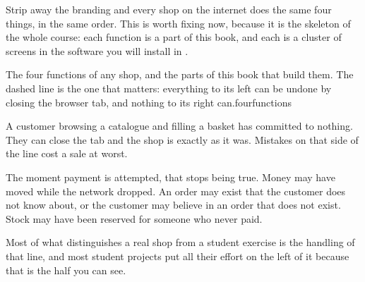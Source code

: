 Strip away the branding and every shop on the internet does the same four
things, in the same order. This is worth fixing now, because it is the skeleton
of the whole course: each function is a part of this book, and each is a cluster
of screens in the software you will install in .

%
{The four functions of any shop, and the parts of this book that build them.
The dashed line is the one that matters: everything to its left can be undone
by closing the browser tab, and nothing to its right can.}{fourfunctions}

\begin{conceptbox}
A customer browsing a catalogue and filling a basket has committed to nothing.
They can close the tab and the shop is exactly as it was. Mistakes on that side
of the line cost a sale at worst.

\smallskip
The moment payment is attempted, that stops being true. Money may have moved
while the network dropped. An order may exist that the customer does not know
about, or the customer may believe in an order that does not exist. Stock may
have been reserved for someone who never paid.

\smallskip
Most of what distinguishes a real shop from a student exercise is the handling
of that line, and most student projects put all their effort on the left of it
because that is the half you can see.
\end{conceptbox}

